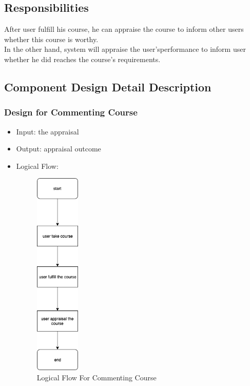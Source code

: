 \documentclass[16pt]{scrreprt}
\begin{document}
\subsection{Responsibilities}
After user fulfill his course, he can appraise the course to inform other users whether this course is worthy.\\
In the other hand, system will appraise the user’sperformance to inform user whether he did reaches the course's requirements.

\subsection{Component Design Detail Description}
\subsubsection{Design for Commenting Course}
\begin{itemize}
    \item Input: the appraisal
    \item Output: appraisal outcome
    \item Logical Flow:
    \begin{figure}[H]
        \centering
        \includegraphics[width=0.2\textwidth]{diagrams/flow-appraisal.png}
        \caption{Logical Flow For Commenting Course}
    \end{figure}
\end{itemize}
\end{document}
